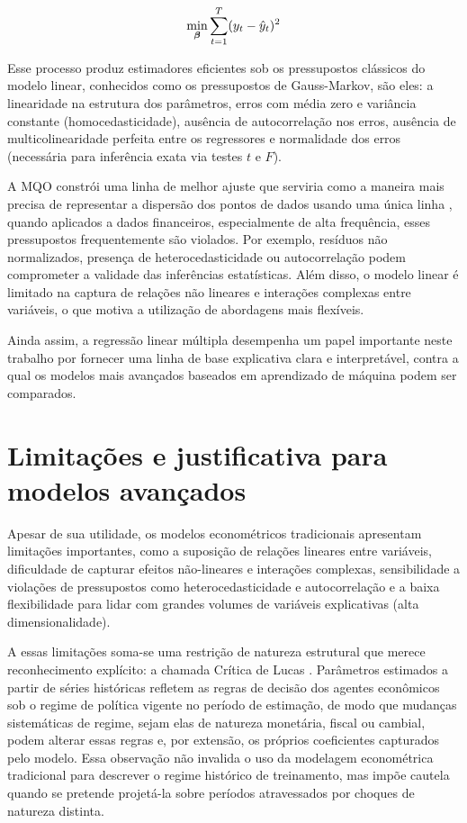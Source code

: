 \documentclass[	12pt, Times, openright, oneside, a4paper, english, brazil]{abntex2}
\begin{document}
\begin{equation}\hfill
\min_{\boldsymbol{\beta}} \sum_{t=1}^{T} (y_t - \hat{y}_t)^2
\label{eq:MQO_min}
\end{equation}

Esse processo produz estimadores eficientes sob os pressupostos clássicos do modelo linear, conhecidos como os pressupostos de Gauss-Markov, são eles: a linearidade na estrutura dos parâmetros, erros com média zero e variância constante (homocedasticidade), ausência de autocorrelação nos erros, ausência de multicolinearidade perfeita entre os regressores e normalidade dos erros (necessária para inferência exata via testes $t$ e $F$). 

A MQO constrói uma linha de melhor ajuste que serviria como a maneira mais precisa de representar a dispersão dos pontos de dados usando uma única linha \cite{Burton2021OLS}, quando aplicados a dados financeiros, especialmente de alta frequência, esses pressupostos frequentemente são violados. Por exemplo, resíduos não normalizados, presença de heterocedasticidade ou autocorrelação podem comprometer a validade das inferências estatísticas. Além disso, o modelo linear é limitado na captura de relações não lineares e interações complexas entre variáveis, o que motiva a utilização de abordagens mais flexíveis.

Ainda assim, a regressão linear múltipla desempenha um papel importante neste trabalho por fornecer uma linha de base explicativa clara e interpretável, contra a qual os modelos mais avançados baseados em aprendizado de máquina podem ser comparados.



\section{Limitações e justificativa para modelos avançados}

Apesar de sua utilidade, os modelos econométricos tradicionais apresentam limitações importantes, como a suposição de relações lineares entre variáveis, dificuldade de capturar efeitos não-lineares e interações complexas, sensibilidade a violações de pressupostos como heterocedasticidade e autocorrelação e a baixa flexibilidade para lidar com grandes volumes de variáveis explicativas (alta dimensionalidade).

A essas limitações soma-se uma restrição de natureza estrutural que merece reconhecimento explícito: a chamada Crítica de Lucas \cite{lucas1976critique}. Parâmetros estimados a partir de séries históricas refletem as regras de decisão dos agentes econômicos sob o regime de política vigente no período de estimação, de modo que mudanças sistemáticas de regime, sejam elas de natureza monetária, fiscal ou cambial, podem alterar essas regras e, por extensão, os próprios coeficientes capturados pelo modelo. Essa observação não invalida o uso da modelagem econométrica tradicional para descrever o regime histórico de treinamento, mas impõe cautela quando se pretende projetá-la sobre períodos atravessados por choques de natureza distinta.
\end{document}
